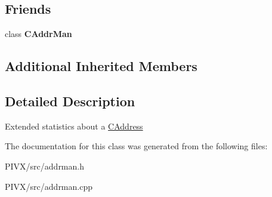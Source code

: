 \subsection*{Friends}
\begin{DoxyCompactItemize}
\item 
\mbox{\label{class_c_addr_info_a17ec4e9e560da58786d2ca36092bf83d}} 
class {\bfseries C\+Addr\+Man}
\end{DoxyCompactItemize}
\subsection*{Additional Inherited Members}


\subsection{Detailed Description}
Extended statistics about a \mbox{\hyperlink{class_c_address}{C\+Address}} 

The documentation for this class was generated from the following files\+:\begin{DoxyCompactItemize}
\item 
P\+I\+V\+X/src/addrman.\+h\item 
P\+I\+V\+X/src/addrman.\+cpp\end{DoxyCompactItemize}
